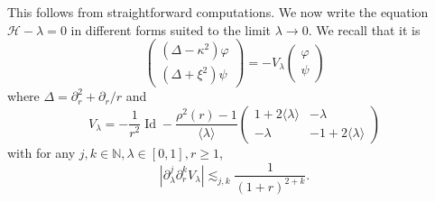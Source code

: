 \documentclass[11 pt]{amsart}
\newcommand{\tmop}[1]{\ensuremath{\operatorname{#1}}}
\theoremstyle{definition}
\theoremstyle{remark}
\numberwithin{equation}{section}
\begin{document}
This follows from straightforward computations. We now write the equation
$\mathcal{H}- \lambda = 0$ in different forms suited to the limit $\lambda
\rightarrow 0$. We recall that it is
\[ \left(\begin{array}{c}
     (\Delta - \kappa^2) \varphi\\
     (\Delta + \xi^2) \psi
   \end{array}\right) = - V_{\lambda} \left(\begin{array}{c}
     \varphi\\
     \psi
   \end{array}\right) \]
where $\Delta=\partial_r^2+\partial_r /r$ and
\[ V_{\lambda} = - \frac{1}{r^2} \tmop{Id} - \frac{\rho^2 (r) - 1}{\langle
   \lambda \rangle} \left(\begin{array}{cc}
     1 + 2 \langle \lambda \rangle & - \lambda\\
     - \lambda & - 1 + 2 \langle \lambda \rangle
   \end{array}\right) \]
with for any $j, k \in \mathbb{N}, \lambda \in [0, 1], r \geqslant 1$,
\[ | \partial_{\lambda}^j \partial_r^k V_{\lambda} | \lesssim_{j, k}
   \frac{1}{(1 + r)^{2 + k}} . \]
\end{document}
